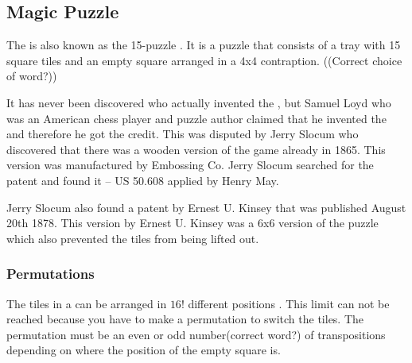 \subsection{Magic Puzzle}
The \mpuzzle{} is also known as the 15-puzzle \cite[pp. 48-50]{Larsen81}. It is a puzzle that consists of a tray with 15 square tiles and an empty square arranged in a 4x4 contraption. ((Correct choice of word?))

It has never been discovered who actually invented the \mpuzzle{}, but Samuel Loyd who was an American chess player and puzzle author claimed that he invented the \mpuzzle{} and therefore he got the credit. %
This was disputed by Jerry Slocum who discovered that there was a wooden version of the game already in 1865. This version was manufactured by Embossing Co. Jerry Slocum searched for the patent and found it -- US 50.608 applied by Henry May.

Jerry Slocum also found a patent by Ernest U. Kinsey that was published August 20th 1878. This version by Ernest U. Kinsey was a 6x6 version of the puzzle which also prevented the tiles from being lifted out.

\subsubsection {Permutations}
The tiles in a \mpuzzle{} can be arranged in $16!$ different positions \cite{jaapsch}. This limit can not be reached because you have to make a permutation to switch the tiles. The permutation must be an even or odd number(correct word?) of transpositions depending on where the position of the empty square is.

